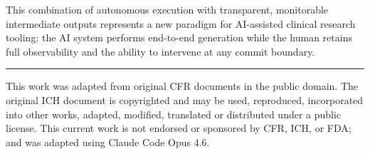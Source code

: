 \documentclass{article}
\begin{document}
\vspace{-0.1cm}

This combination of autonomous execution with transparent, monitorable intermediate outputs represents a new paradigm for AI-assisted clinical research tooling: the AI system performs end-to-end generation while the human retains full observability and the ability to intervene at any commit boundary.

\vspace{2.5cm}

\noindent\rule{\textwidth}{0.4pt}

{\footnotesize This work was adapted from original CFR documents in the public domain. The original ICH document is copyrighted and may be used, reproduced, incorporated into other works, adapted, modified, translated or distributed under a public license. This current work is not endorsed or sponsored by CFR, ICH, or FDA; and was adapted using Claude Code Opus 4.6.}
\end{document}

